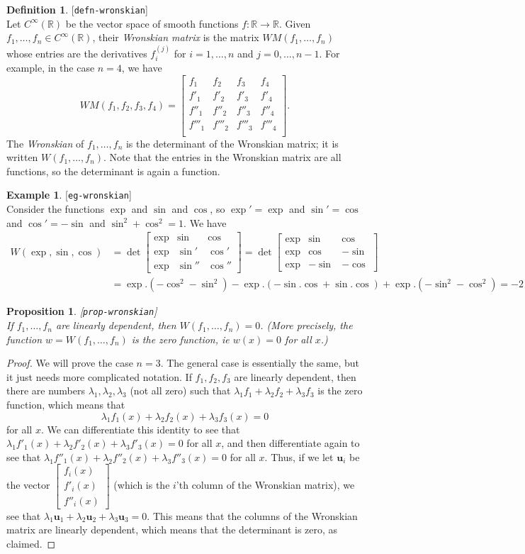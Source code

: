 \documentclass{amsart}
\newcommand{\lbl}[1]{\label{#1}\textup{[\texttt{#1}]}\ \\}
\newcommand{\lbl}{\label}
\newcommand{\R}         {{\mathbb{R}}}
\newcommand{\bbm}       {\left[\begin{matrix}}
\newcommand{\ebm}       {\end{matrix}\right]}
\newcommand{\bsm}       {\left[\begin{smallmatrix}}
\newcommand{\esm}       {\end{smallmatrix}\right]}
\newcommand{\lm}        {\lambda}
\newcommand{\vu}        {\mathbf{u}}
\renewcommand{\:}       {\colon}
\newtheorem{proposition}[theorem]{Proposition}
\theoremstyle{definition}
\newtheorem{definition}[theorem]{Definition}
\newtheorem{example}[theorem]{Example}
\begin{document}
\begin{definition}\lbl{defn-wronskian}
 Let $C^\infty(\R)$ be the vector space of smooth functions
 $f\:\R\to\R$.  Given $f_1,\dotsc,f_n\in C^\infty(\R)$,
 their \emph{Wronskian matrix} is the matrix
 $WM(f_1,\dotsc,f_n)$ whose entries are the derivatives
 $f_i^{(j)}$ for $i=1,\dotsc,n$ and $j=0,\dotsc,n-1$.  For
 example, in the case $n=4$, we have
 \[ WM(f_1,f_2,f_3,f_4) =
    \bbm
     f_1 & f_2 & f_3 & f_4\\
     f'_1 & f'_2 & f'_3 & f'_4 \\
     f''_1 & f''_2 & f''_3 & f''_4 \\
     f'''_1 & f'''_2 & f'''_3 & f'''_4 \\
    \ebm.
 \]
 The \emph{Wronskian} of $f_1,\dotsc,f_n$ is the determinant
 of the Wronskian matrix; it is written $W(f_1,\dotsc,f_n)$.
 Note that the entries in the Wronskian matrix are all
 functions, so the determinant is again a function.
\end{definition}
\begin{example}\lbl{eg-wronskian}
 Consider the functions $\exp$ and $\sin$ and
 $\cos$, so $\exp'=\exp$ and $\sin'=\cos$ and $\cos'=-\sin$ and
 $\sin^2+\cos^2=1$.  We have 
 \begin{align*}
  W(\exp,\sin,\cos) &= 
  \det\bbm
   \exp & \sin & \cos \\
   \exp & \sin' & \cos' \\
   \exp & \sin'' & \cos'' 
  \ebm = 
  \det\bbm
   \exp &  \sin &  \cos \\
   \exp &  \cos & -\sin \\
   \exp & -\sin & -\cos 
  \ebm \\
  &= 
   \exp.(-\cos^2-\sin^2) -\exp.(-\sin.\cos+\sin.\cos) +
   \exp.(-\sin^2-\cos^2) = -2\exp.
 \end{align*}
\end{example}
\begin{proposition}\lbl{prop-wronskian}
 If $f_1,\dotsc,f_n$ are linearly dependent, then
 $W(f_1,\dotsc,f_n)=0$.  (More precisely, the function
 $w=W(f_1,\dotsc,f_n)$ is the zero function, ie $w(x)=0$ for
 all $x$.)
\end{proposition}
\begin{proof}
 We will prove the case $n=3$.  The general case is
 essentially the same, but it just needs more complicated
 notation.  If $f_1,f_2,f_3$ are linearly dependent, then
 there are numbers $\lm_1,\lm_2,\lm_3$ (not all zero) such
 that $\lm_1f_1+\lm_2f_2+\lm_3f_3$ is the zero function,
 which means that 
 \[ \lm_1f_1(x) + \lm_2f_2(x) + \lm_3f_3(x) = 0 \] for all
 $x$.  We can differentiate this identity to see that
 $\lm_1f'_1(x)+\lm_2f'_2(x)+\lm_3f'_3(x)=0$ for all $x$, and
 then differentiate again to see that
 $\lm_1f''_1(x)+\lm_2f''_2(x)+\lm_3f''_3(x)=0$ for all $x$.
 Thus, if we let $\vu_i$ be the vector
 $\bsm f_i(x)\\ f'_i(x)\\ f''_i(x)\esm$ (which is the $i$'th
 column of the Wronskian matrix), we see that
 $\lm_1\vu_1+\lm_2\vu_2+\lm_3\vu_3=0$.  This means that the
 columns of the Wronskian matrix are linearly dependent,
 which means that the determinant is zero, as claimed.
\end{proof}
\end{document}
